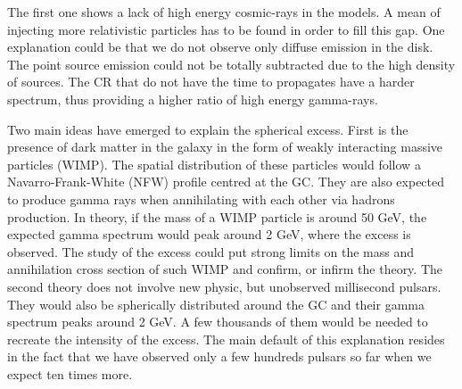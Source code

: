 The first one shows a lack of high energy cosmic-rays in the models. A mean of injecting more relativistic particles has to be found in order to fill this gap. One explanation could be that we do not observe only diffuse emission in the disk. The point source emission could not be totally subtracted due to the high density of sources. The CR that do not have the time to propagates have a harder spectrum, thus providing a higher ratio of high energy gamma-rays.

Two main ideas have emerged to explain the spherical excess.
First is the presence of dark matter in the galaxy in the form of weakly interacting massive particles (WIMP). The spatial distribution of these particles would follow a Navarro-Frank-White (NFW) profile centred at the GC. They are also expected to produce gamma rays when annihilating with each other via hadrons production. In theory, if the mass of a WIMP particle is around 50 GeV, the expected gamma spectrum would peak around 2 GeV, where the excess is observed. 
The study of the excess could put strong limits on the mass and annihilation cross section of such WIMP and confirm, or infirm the theory.
The second theory does not involve new physic, but unobserved millisecond pulsars. They would also be spherically distributed around the GC and their gamma spectrum peaks around 2 GeV. A few thousands of them would be needed to recreate the intensity of the excess. The main default of this explanation resides in the fact that we have observed only a few hundreds pulsars so far when we expect ten times more.







































